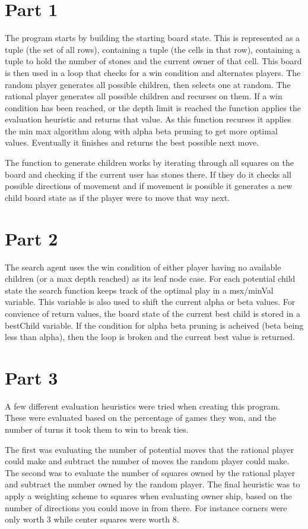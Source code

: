 \documentclass[12pt]{article}
\begin{document}
\section{Part 1}
The program starts by building the starting board state. This is represented as a tuple (the set of all rows), containing a tuple (the cells in that row), containing a tuple to hold the number of stones and the current owner of that cell. This board is then used in a loop that checks for a win condition and alternates players. The random player generates all possible children, then selects one at random. The rational player generates all possible children and recurses on them. If a win condition has been reached, or the depth limit is reached the function applies the evaluation heuristic and returns that value. As this function recurses it applies the min max algorithm along with alpha beta pruning to get more optimal values. Eventually it finishes and returns the best possible next move. 

The function to generate children works by iterating through all squares on the board and checking if the current user has stones there. If they do it checks all possible directions of movement and if movement is possible it generates a new child board state as if the player were to move that way next. 

\section{Part 2}
The search agent uses the win condition of either player having no available children (or a max depth reached) as its leaf node case. For each potential child state the search function keeps track of the optimal play in a msx/minVal variable. This variable is also used to shift the current alpha or beta values. For convience of return values, the board state of the current best child is stored in a bestChild variable. If the condition for alpha beta pruning is acheived (beta being less than alpha), then the loop is broken and the current best value is returned. 

\section{Part 3}
A few different evaluation heuristics were tried when creating this program. These were evaluated based on the percentage of games they won, and the number of turns it took them to win to break ties.

The first was evaluating the number of potential moves that the rational player could make and subtract the number of moves the random player could make. The second was to evaluate the number of squares owned by the rational player and subtract the number owned by the random player. The final heuristic was to apply a weighting scheme to squares when evaluating owner ship, based on the number of directions you could move in from there. For instance corners were only worth 3 while center squares were worth 8.
\end{document}

